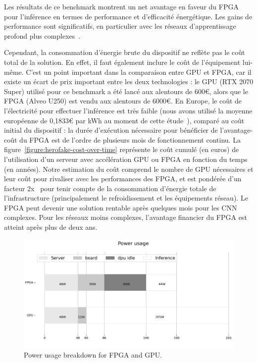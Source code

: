 Les résultats de ce benchmark montrent un net avantage en faveur du FPGA pour l'inférence en termes de performance et d'efficacité énergétique. Les gains de performance sont significatifs, en particulier avec les réseaux d'apprentissage profond plus complexes~\cite{8782524}. %

Cependant, la consommation d'énergie brute du dispositif ne reflète pas le coût total de la solution. En effet, il faut également inclure le coût de l'équipement lui-même. C'est un point important dans la comparaison entre GPU et FPGA, car il existe un écart de prix important entre les deux technologies : le GPU (RTX 2070 Super) utilisé pour ce benchmark a été lancé aux alentours de 600€, alors que le FPGA (Alveo U250) est vendu aux alentours de 6000€. En Europe, le coût de l'électricité pour effectuer l'inférence est très faible (nous avons utilisé la moyenne européenne de 0,1833€ par kWh au moment de cette étude~\cite{energy-price}), comparé au coût initial du dispositif : la durée d'exécution nécessaire pour bénéficier de l'avantage-coût du FPGA est de l'ordre de plusieurs mois de fonctionnement continu. La figure~\ref{figure:herofake-cost-over-time} représente le coût cumulé (en euros) de l'utilisation d'un serveur avec accélération GPU ou FPGA en fonction du temps (en années). Notre estimation du coût comprend le nombre de GPU nécessaires et leur coût pour rivaliser avec les performances des FPGA, et est pondérée d'un facteur 2x~\cite{shehabiUnitedStatesData2016} pour tenir compte de la consommation d'énergie totale de l'infrastructure (principalement le refroidissement et les équipements réseau). Le FPGA peut devenir une solution rentable après quelques mois pour les CNN complexes. Pour les réseaux moins complexes, l'avantage financier du FPGA est atteint après plus de deux ans.

\begin{figure}[!ht]
    \centering
    \includegraphics[width=\columnwidth]{4_Chapitre4/figures/characterization/power_usage.png}
    \caption{Power usage breakdown for FPGA and GPU.}
    \label{figure:herofake-power-usage}
\end{figure}

